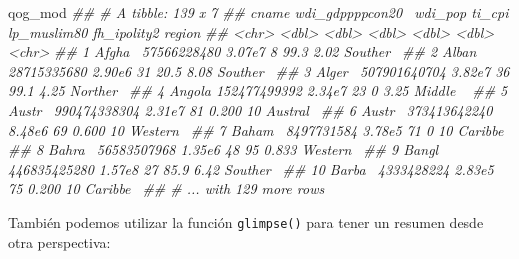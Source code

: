 \documentclass[]{book}
\newenvironment{Shaded}{\begin{snugshade}}{\end{snugshade}}
\newcommand{\CommentTok}[1]{\textcolor[rgb]{0.56,0.35,0.01}{\textit{#1}}}
\newcommand{\KeywordTok}[1]{\textcolor[rgb]{0.13,0.29,0.53}{\textbf{#1}}}
\newcommand{\NormalTok}[1]{#1}
\begin{document}
\begin{Shaded}
\begin{Highlighting}[]
\NormalTok{qog_mod}
\CommentTok{## # A tibble: 139 x 7}
\CommentTok{##    cname  wdi_gdppppcon20~ wdi_pop ti_cpi lp_muslim80 fh_ipolity2 region  }
\CommentTok{##    <chr>             <dbl>   <dbl>  <dbl>       <dbl>       <dbl> <chr>   }
\CommentTok{##  1 Afgha~      57566228480  3.07e7      8      99.3         2.02  Souther~}
\CommentTok{##  2 Alban~      28715335680  2.90e6     31      20.5         8.08  Souther~}
\CommentTok{##  3 Alger~     507901640704  3.82e7     36      99.1         4.25  Norther~}
\CommentTok{##  4 Angola     152477499392  2.34e7     23       0           3.25  Middle ~}
\CommentTok{##  5 Austr~     990474338304  2.31e7     81       0.200      10     Austral~}
\CommentTok{##  6 Austr~     373413642240  8.48e6     69       0.600      10     Western~}
\CommentTok{##  7 Baham~       8497731584  3.78e5     71       0          10     Caribbe~}
\CommentTok{##  8 Bahra~      56583507968  1.35e6     48      95           0.833 Western~}
\CommentTok{##  9 Bangl~     446835425280  1.57e8     27      85.9         6.42  Souther~}
\CommentTok{## 10 Barba~       4333428224  2.83e5     75       0.200      10     Caribbe~}
\CommentTok{## # ... with 129 more rows}
\end{Highlighting}
\end{Shaded}

También podemos utilizar la función \texttt{glimpse()} para tener un
resumen desde otra perspectiva:

\begin{Shaded}
\end{Shaded}
\end{document}
